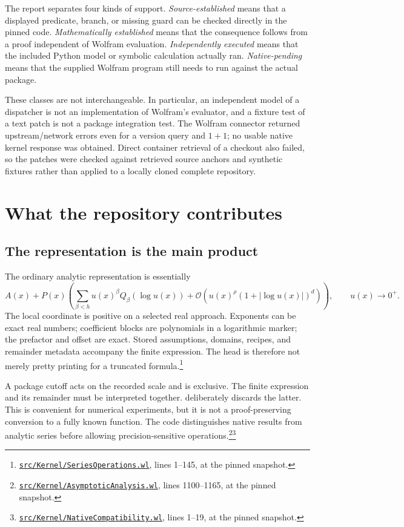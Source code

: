 \documentclass[11pt,letterpaper]{article}
\newcommand{\code}[1]{\texttt{\detokenize{#1}}}
\newcommand{\sr}[3]{\footnote{\href{https://github.com/VladimirReshetnikov/Asymptotic/blob/6687962f3c858a4f93623cfc496f33e35c6763d4/#1\#L#2-L#3}{\nolinkurl{#1}}, lines #2--#3, at the pinned snapshot.}}
\newcommand{\OO}{\mathcal O}
\begin{document}
The report separates four kinds of support. \emph{Source-established} means that a displayed predicate, branch, or missing guard can be checked directly in the pinned code. \emph{Mathematically established} means that the consequence follows from a proof independent of Wolfram evaluation. \emph{Independently executed} means that the included Python model or symbolic calculation actually ran. \emph{Native-pending} means that the supplied Wolfram program still needs to run against the actual package.

These classes are not interchangeable. In particular, an independent model of a dispatcher is not an implementation of Wolfram's evaluator, and a fixture test of a text patch is not a package integration test. The Wolfram connector returned upstream/network errors even for a version query and $1+1$; no usable native kernel response was obtained. Direct container retrieval of a checkout also failed, so the patches were checked against retrieved source anchors and synthetic fixtures rather than applied to a locally cloned complete repository.

\section{What the repository contributes}

\subsection{The representation is the main product}

The ordinary analytic representation is essentially
\begin{equation}\label{eq:representation}
 A(x)+P(x)\left(\sum_{\beta<h}u(x)^\beta Q_\beta(\log u(x))
 +\OO\!\left(u(x)^\rho(1+|\log u(x)|)^d\right)\right),\qquad u(x)\to0^+.
\end{equation}
The local coordinate is positive on a selected real approach. Exponents can be exact real numbers; coefficient blocks are polynomials in a logarithmic marker; the prefactor and offset are exact. Stored assumptions, domains, recipes, and remainder metadata accompany the finite expression. The \code{GeneralizedSeries} head is therefore not merely pretty printing for a truncated formula.\sr{src/Kernel/SeriesOperations.wl}{1}{145}

A package cutoff acts on the recorded scale and is exclusive. The finite expression and its remainder must be interpreted together. \code{Normal} deliberately discards the latter. This is convenient for numerical experiments, but it is not a proof-preserving conversion to a fully known function. The code distinguishes native results from analytic series before allowing precision-sensitive operations.\sr{src/Kernel/AsymptoticAnalysis.wl}{1100}{1165}\sr{src/Kernel/NativeCompatibility.wl}{1}{19}
\end{document}
